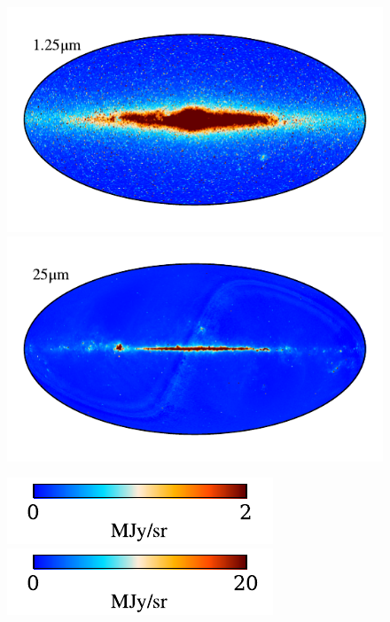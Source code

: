 \documentclass{aa}
\begin{document}
\begin{figure}

  \centering
    \includegraphics[width=0.8\columnwidth]{figs/freq_maps/freq_01_c0001_000019.pdf}\includegraphics[width=0.8\columnwidth]{figs/freq_maps/freq_06_c0001_000019.pdf}
    \vspace*{-0.5cm}

    \includegraphics[width=0.4\columnwidth]{figs/freq_maps/freq_cbar_01_c0001_000019.pdf}\hspace{3.6cm}\includegraphics[width=0.4\columnwidth]{figs/freq_maps/freq_cbar_06_c0001_000019.pdf}


\end{figure}
\end{document}
